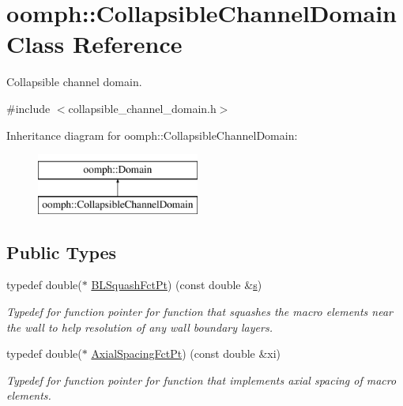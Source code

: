 \hypertarget{classoomph_1_1CollapsibleChannelDomain}{}\section{oomph\+:\+:Collapsible\+Channel\+Domain Class Reference}
\label{classoomph_1_1CollapsibleChannelDomain}


Collapsible channel domain.  




{\ttfamily \#include $<$collapsible\+\_\+channel\+\_\+domain.\+h$>$}

Inheritance diagram for oomph\+:\+:Collapsible\+Channel\+Domain\+:\begin{figure}[H]
\begin{center}
\leavevmode
\includegraphics[height=2.000000cm]{classoomph_1_1CollapsibleChannelDomain}
\end{center}
\end{figure}
\subsection*{Public Types}
\begin{DoxyCompactItemize}
\item 
typedef double($\ast$ \hyperlink{classoomph_1_1CollapsibleChannelDomain_a2bf1d7943bfac134a5c27a54c7e1faed}{B\+L\+Squash\+Fct\+Pt}) (const double \&\hyperlink{cfortran_8h_ab7123126e4885ef647dd9c6e3807a21c}{s})
\begin{DoxyCompactList}\small\item\em Typedef for function pointer for function that squashes the macro elements near the wall to help resolution of any wall boundary layers. \end{DoxyCompactList}\item 
typedef double($\ast$ \hyperlink{classoomph_1_1CollapsibleChannelDomain_a317472dab112beac771ecf6442a465f5}{Axial\+Spacing\+Fct\+Pt}) (const double \&xi)
\begin{DoxyCompactList}\small\item\em Typedef for function pointer for function that implements axial spacing of macro elements. \end{DoxyCompactList}\end{DoxyCompactItemize}
